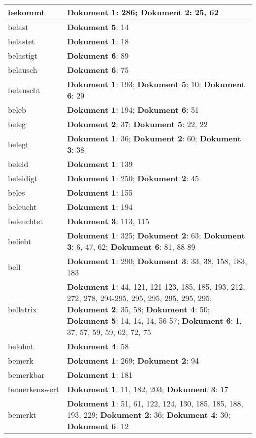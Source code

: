 \documentclass[a5paper]{article}
\begin{document}
\begin{longtable}[l]{|l|p{3in}|}
\hline
bekommt & \textbf{Dokument 1}: 286; \textbf{Dokument 2}: 25, 62 \\
\hline
belast & \textbf{Dokument 5}: 14 \\
\hline
belastet & \textbf{Dokument 1}: 18 \\
\hline
belastigt & \textbf{Dokument 6}: 89 \\
\hline
belausch & \textbf{Dokument 6}: 75 \\
\hline
belauscht & \textbf{Dokument 1}: 193; \textbf{Dokument 5}: 10; \textbf{Dokument 6}: 29 \\
\hline
beleb & \textbf{Dokument 1}: 194; \textbf{Dokument 6}: 51 \\
\hline
beleg & \textbf{Dokument 2}: 37; \textbf{Dokument 5}: 22, 22 \\
\hline
belegt & \textbf{Dokument 1}: 36; \textbf{Dokument 2}: 60; \textbf{Dokument 3}: 38 \\
\hline
beleid & \textbf{Dokument 1}: 139 \\
\hline
beleidigt & \textbf{Dokument 1}: 250; \textbf{Dokument 2}: 45 \\
\hline
beles & \textbf{Dokument 1}: 155 \\
\hline
beleucht & \textbf{Dokument 1}: 194 \\
\hline
beleuchtet & \textbf{Dokument 3}: 113, 115 \\
\hline
beliebt & \textbf{Dokument 1}: 325; \textbf{Dokument 2}: 63; \textbf{Dokument 3}: 6, 47, 62; \textbf{Dokument 6}: 81, 88-89 \\
\hline
bell & \textbf{Dokument 1}: 290; \textbf{Dokument 3}: 33, 38, 158, 183, 183 \\
\hline
bellatrix & \textbf{Dokument 1}: 44, 121, 121-123, 185, 185, 193, 212, 272, 278, 294-295, 295, 295, 295, 295, 295; \textbf{Dokument 2}: 35, 58; \textbf{Dokument 4}: 50; \textbf{Dokument 5}: 14, 14, 14, 56-57; \textbf{Dokument 6}: 1, 37, 57, 59, 59, 62, 72, 75 \\
\hline
belohnt & \textbf{Dokument 4}: 58 \\
\hline
bemerk & \textbf{Dokument 1}: 269; \textbf{Dokument 2}: 94 \\
\hline
bemerkbar & \textbf{Dokument 1}: 181 \\
\hline
bemerkenswert & \textbf{Dokument 1}: 11, 182, 203; \textbf{Dokument 3}: 17 \\
\hline
bemerkt & \textbf{Dokument 1}: 51, 61, 122, 124, 130, 185, 185, 188, 193, 229; \textbf{Dokument 2}: 36; \textbf{Dokument 4}: 30; \textbf{Dokument 6}: 12 \\

\end{longtable}
\end{document}
